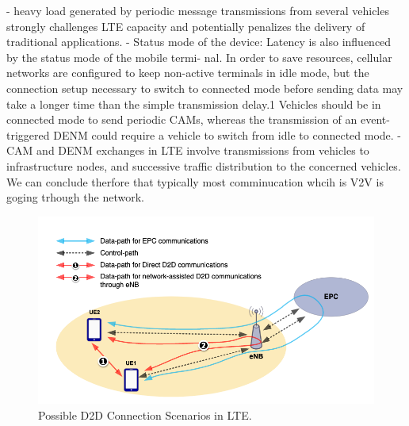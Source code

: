 \documentclass[conference,12pt,onecolumn]{IEEEtran}
\begin{document}
- heavy load generated by periodic message transmissions from several vehicles strongly challenges LTE capacity and potentially penalizes the delivery of traditional applications. \cite{araniti2013}
- Status mode of the device: Latency is also influenced by the status mode of the mobile termi- nal. In order to save resources, cellular networks are configured to keep non-active terminals in idle mode, but the connection setup necessary to switch to connected mode before sending data may take a longer time than the simple transmission delay.1 Vehicles should be in connected mode to send periodic CAMs, whereas the transmission of an event-triggered DENM could require a vehicle to switch from idle to connected mode. \cite{araniti2013}
- CAM and DENM exchanges in LTE involve transmissions from vehicles to infrastructure nodes, and successive traffic distribution to the concerned vehicles. \cite{araniti2013} We can conclude therfore that typically most comminucation whcih is V2V is goging trhough the network.

\begin{figure} [ht]
   \centering
   \includegraphics[width=0.7\linewidth]{_Graphics/lte_d2d_usecases.png}
  \caption{Possible D2D Connection Scenarios in LTE. \cite{gunes2014}}
  \label{fig:lte_d2d_usecases}
\end{figure}
\end{document}
